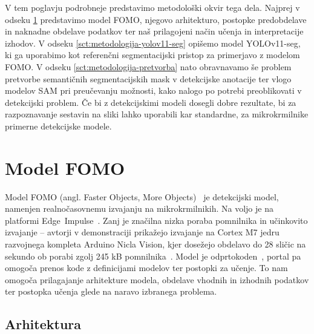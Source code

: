 \documentclass[a4paper,twoside,openright,12pt,slovene]{book}
\begin{document}
    V tem poglavju podrobneje predstavimo metodološki okvir tega dela. Najprej v odseku \ref{sct:metodologija-fomo} predstavimo model FOMO, njegovo arhitekturo, postopke predobdelave in naknadne obdelave podatkov ter naš prilagojeni način učenja in interpretacije izhodov. V odseku \ref{sct:metodologija-yolov11-seg} opišemo model YOLOv11-seg, ki ga uporabimo kot referenčni segmentacijski pristop za primerjavo z modelom FOMO. V odseku \ref{sct:metodologija-pretvorba} nato obravnavamo še problem pretvorbe semantičnih segmentacijskih mask v detekcijske anotacije ter vlogo modelov SAM pri preučevanju možnosti, kako nalogo po potrebi preoblikovati v detekcijski problem.
    Če bi z detekcijskimi modeli dosegli dobre rezultate, bi za razpoznavanje sestavin na sliki lahko uporabili kar standardne, za mikrokrmilnike primerne detekcijske modele.

    \section{Model FOMO} \label{sct:metodologija-fomo}


        Model FOMO (angl. Faster Objects, More Objects)~\cite{src:announcingfomo, src:fomodocs} je detekcijski model, namenjen realnočasovnemu izvajanju na mikrokrmilnikih. Na voljo je na platformi \mbox{Edge Impulse}~\cite{src:fomodocs}. Zanj je značilna nizka poraba pomnilnika in učinkovito izvajanje -- avtorji v demonstraciji prikažejo izvajanje na Cortex M7 jedru razvojnega kompleta Arduino Nicla Vision, kjer dosežejo obdelavo do 28 sličic na sekundo ob porabi zgolj 245 kB pomnilnika~\cite{src:fomodocs}.
        Model je odprtokoden~\cite{src:fomodocs}, portal pa omogoča prenos kode z definicijami modelov ter postopki za učenje. To nam omogoča prilagajanje arhitekture modela, obdelave vhodnih in izhodnih podatkov ter postopka učenja glede na naravo izbranega problema.

        \subsection{Arhitektura} \label{sct:fomo-arhitektura}
\end{document}
